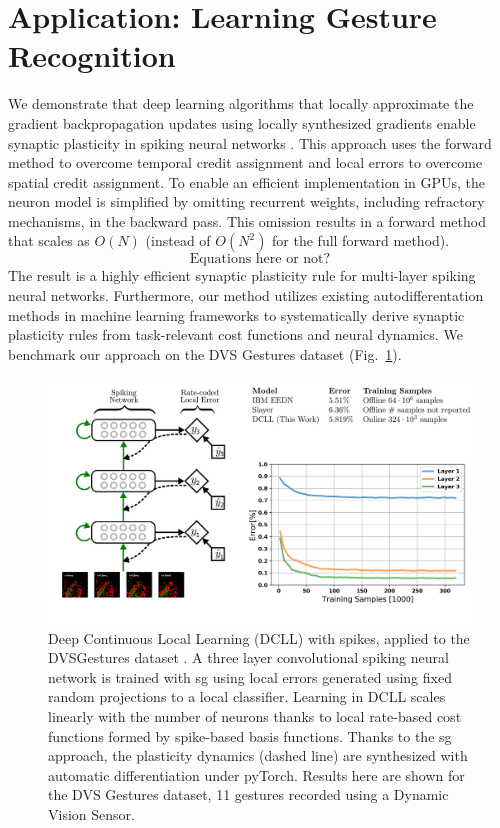 \documentclass[journal,onecolumn,11pt]{IEEEtran}
\newcommand{\reffig}[1]{{\color{blue!70}(Fig.~\ref{#1})}}
\begin{document}
\section{Application: Learning Gesture Recognition}
We demonstrate that deep learning algorithms that locally approximate the gradient backpropagation updates using locally synthesized gradients enable synaptic plasticity in spiking neural networks \cite{Kaiser_etal18_synaplas}.
This approach uses the forward method to overcome temporal credit assignment and local errors to overcome spatial credit assignment. 
To enable an efficient implementation in GPUs, the neuron model is simplified by omitting recurrent weights, including refractory mechanisms, in the backward pass. This omission results in a forward method that scales as $O(N)$ (instead of $O(N^2)$ for the full forward method).
\begin{equation}
  \text{Equations here or not?}
\end{equation}
The result is a highly efficient synaptic plasticity rule for multi-layer spiking neural networks.
Furthermore, our method utilizes existing autodifferentation methods in machine learning frameworks to systematically derive synaptic plasticity rules from task-relevant cost functions and neural dynamics. 
We benchmark our approach on the DVS Gestures dataset \reffig{fig:dcll_gestures}. 
\begin{figure}
  \includegraphics[width=.9\textwidth]{figures/DCLL_illustration}
  \caption{\label{fig:dcll_gestures} Deep Continuous Local Learning (DCLL) with spikes, applied to the DVSGestures dataset \cite{Amir_etal17_lowpowe}. A three layer convolutional spiking neural network is trained with \gls{sg} using local errors generated using fixed random projections to a local classifier. Learning in DCLL scales linearly with the number of neurons thanks to local rate-based cost functions formed by spike-based basis functions. Thanks to the \gls{sg} approach, the plasticity dynamics (dashed line) are synthesized with automatic differentiation under pyTorch. Results here are shown for the DVS Gestures dataset, 11 gestures recorded using a Dynamic Vision Sensor.}
\end{figure}
\end{document}
